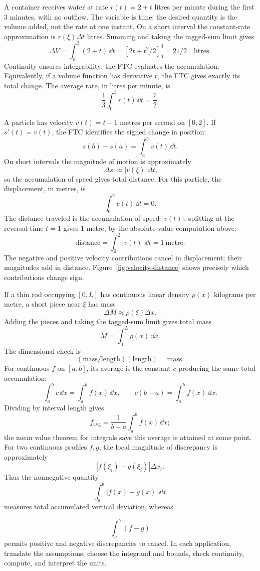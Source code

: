 \begin{example}
A container receives water at rate $r(t)=2+t$ litres per minute during
the first $3$ minutes, with no outflow. The variable is time;
the desired quantity is the volume added, not the rate at one instant.
On a short interval the constant-rate approximation is
$r(\xi)\Delta t$ litres. Summing and taking the tagged-sum limit gives
\[
\Delta V=\int_0^3(2+t)\,\dd t=[2t+t^2/2]_0^3=21/2
\quad\text{litres}.
\]
Continuity ensures integrability; the FTC evaluates the accumulation.
Equivalently, if a volume function has derivative $r$, the FTC gives
exactly its total change. The average rate, in litres per minute, is
\[
\frac13\int_0^3r(t)\,\dd t=\frac72.
\]
\end{example}

\begin{example}
A particle has velocity $v(t)=t-1$ metres per second on $[0,2]$.
If $s'(t)=v(t)$, the FTC identifies the signed change in position:
\[
s(b)-s(a)=\int_a^b v(t)\,\dd t.
\]
On short intervals the magnitude of motion is approximately
\[
|\Delta s|\approx|v(\xi)|\Delta t,
\]
so the accumulation of speed gives total distance. For this particle,
the displacement, in metres, is
\[
\int_0^2v(t)\,\dd t=0.
\]
The distance traveled is the accumulation of speed $|v(t)|$;
splitting at the reversal time $t=1$ gives $1$ metre, by the
absolute-value computation above:
\[
\text{distance}=\int_0^2|v(t)|\,\dd t=1\ \text{metre}.
\]
The negative and positive velocity contributions cancel in displacement;
their magnitudes add in distance. Figure~\ref{fig:velocity-distance}
shows precisely which contributions change sign.
\end{example}



\begin{example}
If a thin rod occupying \([0,L]\) has continuous linear density
\(\rho(x)\) kilograms per metre, a short piece near $\xi$ has mass
\[
\Delta M\approx\rho(\xi)\Delta x.
\]
Adding the pieces and taking the tagged-sum limit gives total mass
\[
M=\int_0^L\rho(x)\,\dd x.
\]
The dimensional check is
\[
(\text{mass/length})(\text{length})=\text{mass}.
\]
For continuous $f$ on $[a,b]$, its average is the constant $c$ producing
the same total accumulation:
\[
\int_a^b c\,\dd x=\int_a^b f(x)\,\dd x,
\qquad c(b-a)=\int_a^b f(x)\,\dd x.
\]
Dividing by interval length gives
\[
f_{\mathrm{avg}}=\frac1{b-a}\int_a^b f(x)\,\dd x;
\]
the mean value theorem for integrals says this average is attained at some
point. For two continuous profiles $f,g$, the local magnitude of discrepancy is
approximately
\[
|f(\xi_i)-g(\xi_i)|\Delta x_i.
\]
Thus the nonnegative quantity
\[
\int_a^b|f(x)-g(x)|\,\dd x
\]
measures total accumulated vertical deviation, whereas

\[
\int_a^b(f-g)
\]
 permits positive and negative discrepancies to cancel.
In each application, translate the assumptions, choose the
integrand and bounds, check continuity, compute, and interpret the units.
\end{example}

